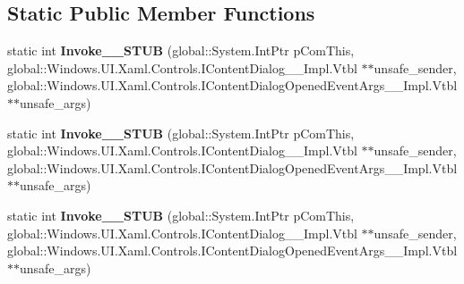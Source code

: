 \subsection*{Static Public Member Functions}
\begin{DoxyCompactItemize}
\item 
\mbox{\label{struct_windows_1_1_foundation_1_1_typed_event_handler___a___windows___u_i___xaml___controls___co7eff74cfd44b375ec88a14fae1c258be_aa06d401f175726b3933a91c4a9d22514}} 
static int {\bfseries Invoke\+\_\+\+\_\+\+S\+T\+UB} (global\+::\+System.\+Int\+Ptr p\+Com\+This, global\+::\+Windows.\+U\+I.\+Xaml.\+Controls.\+I\+Content\+Dialog\+\_\+\+\_\+\+Impl.\+Vtbl $\ast$$\ast$unsafe\+\_\+sender, global\+::\+Windows.\+U\+I.\+Xaml.\+Controls.\+I\+Content\+Dialog\+Opened\+Event\+Args\+\_\+\+\_\+\+Impl.\+Vtbl $\ast$$\ast$unsafe\+\_\+args)
\item 
\mbox{\label{struct_windows_1_1_foundation_1_1_typed_event_handler___a___windows___u_i___xaml___controls___co7eff74cfd44b375ec88a14fae1c258be_aa06d401f175726b3933a91c4a9d22514}} 
static int {\bfseries Invoke\+\_\+\+\_\+\+S\+T\+UB} (global\+::\+System.\+Int\+Ptr p\+Com\+This, global\+::\+Windows.\+U\+I.\+Xaml.\+Controls.\+I\+Content\+Dialog\+\_\+\+\_\+\+Impl.\+Vtbl $\ast$$\ast$unsafe\+\_\+sender, global\+::\+Windows.\+U\+I.\+Xaml.\+Controls.\+I\+Content\+Dialog\+Opened\+Event\+Args\+\_\+\+\_\+\+Impl.\+Vtbl $\ast$$\ast$unsafe\+\_\+args)
\item 
\mbox{\label{struct_windows_1_1_foundation_1_1_typed_event_handler___a___windows___u_i___xaml___controls___co7eff74cfd44b375ec88a14fae1c258be_aa06d401f175726b3933a91c4a9d22514}} 
static int {\bfseries Invoke\+\_\+\+\_\+\+S\+T\+UB} (global\+::\+System.\+Int\+Ptr p\+Com\+This, global\+::\+Windows.\+U\+I.\+Xaml.\+Controls.\+I\+Content\+Dialog\+\_\+\+\_\+\+Impl.\+Vtbl $\ast$$\ast$unsafe\+\_\+sender, global\+::\+Windows.\+U\+I.\+Xaml.\+Controls.\+I\+Content\+Dialog\+Opened\+Event\+Args\+\_\+\+\_\+\+Impl.\+Vtbl $\ast$$\ast$unsafe\+\_\+args)
\item 

\end{DoxyCompactItemize}
